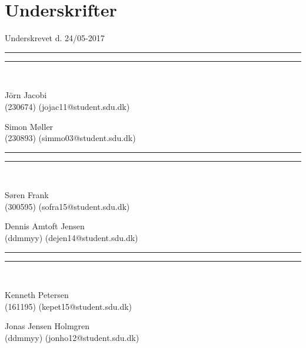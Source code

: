 
\section*{Underskrifter}
\vspace{3ex} \hfill Underskrevet d. 24/05-2017\\

\newlength{\streg} \setlength{\streg}{0.49\linewidth}
\vspace*{\fill} \rule{\streg}{1pt} \hfill \rule{\streg}{1pt}\\
\begin{minipage}[b]{\streg}
 \centering
 \rule{0pt}{4ex}
 J\"{o}rn Jacobi \\
 {\footnotesize (230674) (jojac11@student.sdu.dk)}
\end{minipage}
\hfill
\begin{minipage}[b]{\streg}
 \centering
 Simon Møller \\
 {\footnotesize (230893) (simmo03@student.sdu.dk)}
\end{minipage}

\vspace*{\fill} \rule{\streg}{1pt} \hfill \rule{\streg}{1pt}\\
\begin{minipage}[b]{\streg}
 \centering
 \rule{0pt}{4ex}
 Søren Frank \\
 {\footnotesize (300595) (sofra15@student.sdu.dk)}
\end{minipage}
\hfill
\begin{minipage}[b]{\streg}
 \centering
 Dennis Amtoft Jensen \\
 {\footnotesize (ddmmyy) (dejen14@student.sdu.dk)}
\end{minipage}

\vspace*{\fill} \rule{\streg}{1pt} \hfill \rule{\streg}{1pt}\\
\begin{minipage}[b]{\streg}
	\centering
	\rule{0pt}{4ex}
	Kenneth Petersen \\
	{\footnotesize (161195) (kepet15@student.sdu.dk)}
\end{minipage}
\hfill
\begin{minipage}[b]{\streg}
	\centering
	Jonas Jensen Holmgren  \\
	{\footnotesize (ddmmyy) (jonho12@student.sdu.dk)}
\end{minipage}
